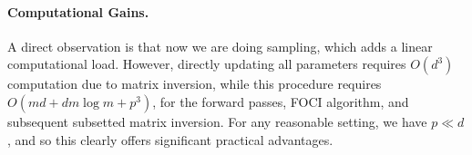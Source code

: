 \paragraph{Computational Gains.}
A direct observation is that now we are doing sampling, which adds a linear computational load.
However, directly updating all parameters requires $O(d^3)$ computation due to matrix inversion, while this procedure requires $O(md + dm\log m + p^3)$, for the forward passes, FOCI algorithm, and subsequent subsetted matrix inversion. For any reasonable setting, we have $p \ll d$, and so this clearly offers significant practical advantages.











